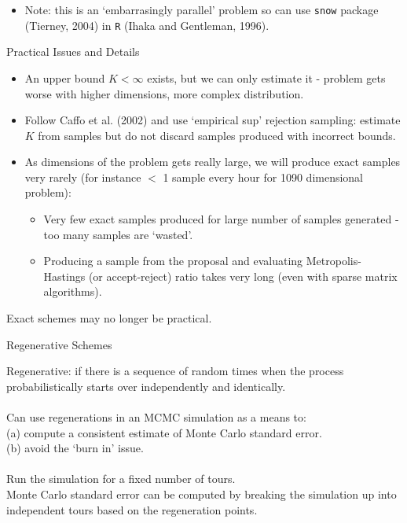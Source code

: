 \documentclass{report}
\newcommand{\head}[1]
{
  \begin{center}
      {\huge {\color{blue} #1}}
    \end{center}
  }
\begin{document}
{\begin{itemize}
\item Note: this is an `embarrasingly parallel' problem so can use {\tt snow} package (Tierney, 2004) in {\tt R} (Ihaka and Gentleman, 1996).
\end{itemize}
\newpage \head{Practical Issues and Details}
\begin{itemize}
\item An upper bound $K < \infty$ exists, but we can only estimate it - problem gets worse with higher dimensions, more complex distribution.
\item Follow Caffo et al. (2002) and use `empirical sup' rejection sampling: estimate $K$ from samples but do not discard samples produced with incorrect bounds.
\item As dimensions of the problem gets really large, we will produce exact samples very rarely (for instance $<$ 1 sample every hour for 1090 dimensional problem):
\begin{itemize}
\item Very few exact samples produced for large number of samples generated - too many samples are `wasted'.
\item Producing a sample from the proposal and evaluating Metropolis-Hastings (or accept-reject) ratio takes very long (even with sparse matrix algorithms).
\end{itemize}
\end{itemize}
Exact schemes may no longer be practical.
\newpage \head{Regenerative Schemes} 
Regenerative: if there is a sequence of random times when
the process probabilistically starts over independently and identically.\\\\
Can use regenerations in an MCMC
simulation as a means to:\\ 
(a) compute a consistent estimate of Monte Carlo standard error. \\
(b) avoid the `burn in' issue.\\\\
Run the simulation for a fixed number of tours.\\
Monte Carlo standard error can be computed by breaking the simulation up into independent tours based on the regeneration points.\\\\
}
\end{document}
